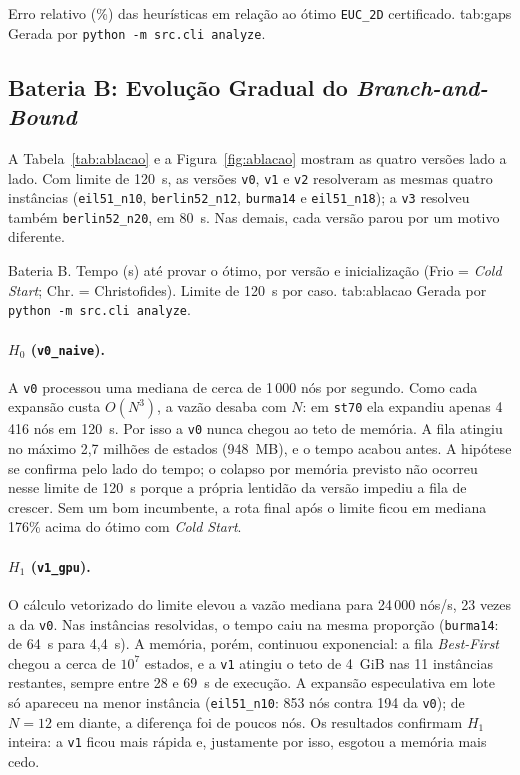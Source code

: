 {Erro relativo (\%) das heurísticas em relação ao ótimo \texttt{EUC\_2D} certificado.}
{tab:gaps}
{Gerada por \texttt{python -m src.cli analyze}.}

\subsection{Bateria B: Evolução Gradual do \textit{Branch-and-Bound}}
\label{sec:res_bnb}

A Tabela~\ref{tab:ablacao} e a Figura~\ref{fig:ablacao} mostram as quatro versões lado a lado.
Com limite de 120~s, as versões \texttt{v0}, \texttt{v1} e \texttt{v2} resolveram as mesmas
quatro instâncias (\texttt{eil51\_n10}, \texttt{berlin52\_n12}, \texttt{burma14} e
\texttt{eil51\_n18}); a \texttt{v3} resolveu também \texttt{berlin52\_n20}, em 80~s. Nas
demais, cada versão parou por um motivo diferente.

{Bateria B. Tempo (s) até provar o ótimo, por versão e inicialização (Frio = \textit{Cold Start};
Chr. = Christofides). Limite de 120~s por caso.}
{tab:ablacao}
{Gerada por \texttt{python -m src.cli analyze}.}

\paragraph{$H_0$ (\texttt{v0\_naive}).}
A \texttt{v0} processou uma mediana de cerca de 1\,000 nós por segundo. Como cada expansão custa
$O(N^3)$, a vazão desaba com $N$: em \texttt{st70} ela expandiu apenas 4\,416 nós em 120~s. Por
isso a \texttt{v0} nunca chegou ao teto de memória. A fila atingiu no máximo 2,7 milhões de
estados (948~MB), e o tempo acabou antes. A hipótese se confirma pelo lado do tempo; o colapso
por memória previsto não ocorreu nesse limite de 120~s porque a própria lentidão da versão
impediu a fila de crescer. Sem um bom incumbente, a rota final após o limite ficou em mediana
176\% acima do ótimo com \textit{Cold Start}.

\paragraph{$H_1$ (\texttt{v1\_gpu}).}
O cálculo vetorizado do limite elevou a vazão mediana para 24\,000 nós/s, 23 vezes a da
\texttt{v0}. Nas instâncias resolvidas, o tempo caiu na mesma proporção (\texttt{burma14}: de
64~s para 4,4~s). A memória, porém, continuou exponencial: a fila \textit{Best-First} chegou a
cerca de $10^7$ estados, e a \texttt{v1} atingiu o teto de 4~GiB nas 11 instâncias restantes,
sempre entre 28 e 69~s de execução. A expansão especulativa em lote só apareceu na menor
instância (\texttt{eil51\_n10}: 853 nós contra 194 da \texttt{v0}); de $N = 12$ em diante, a
diferença foi de poucos nós. Os resultados confirmam $H_1$ inteira: a \texttt{v1} ficou mais
rápida e, justamente por isso, esgotou a memória mais cedo.

